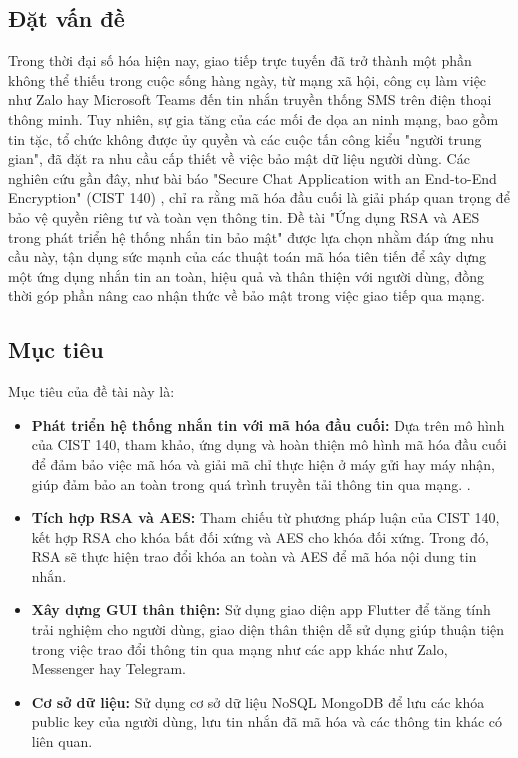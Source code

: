 \setcounter{section}{0}
\renewcommand{\thesubsection}{\arabic{subsection}.}

\subsection{Đặt vấn đề}
\indent Trong thời đại số hóa hiện nay, giao tiếp trực tuyến đã trở thành một phần không thể thiếu trong cuộc sống hàng ngày, từ mạng xã hội, công cụ làm việc như Zalo hay Microsoft Teams đến tin nhắn truyền thống SMS trên điện thoại thông minh. Tuy nhiên, sự gia tăng của các mối đe dọa an ninh mạng, bao gồm tin tặc, tổ chức không được ủy quyền và các cuộc tấn công kiểu "người trung gian", đã đặt ra nhu cầu cấp thiết về việc bảo mật dữ liệu người dùng. Các nghiên cứu gần đây, như bài báo "Secure Chat Application with an End-to-End Encryption" (CIST 140) \cite{carranza2024}, chỉ ra rằng mã hóa đầu cuối là giải pháp quan trọng để bảo vệ quyền riêng tư và toàn vẹn thông tin. Đề tài "Ứng dụng RSA và AES trong phát triển hệ thống nhắn tin bảo mật" được lựa chọn nhằm đáp ứng nhu cầu này, tận dụng sức mạnh của các thuật toán mã hóa tiên tiến để xây dựng một ứng dụng nhắn tin an toàn, hiệu quả và thân thiện với người dùng, đồng thời góp phần nâng cao nhận thức về bảo mật trong việc giao tiếp qua mạng.
\subsection{ Mục tiêu}
\indent Mục tiêu của đề tài này là:
\begin{itemize}
  \item \textbf{Phát triển hệ thống nhắn tin với mã hóa đầu cuối:} 
  Dựa trên mô hình của CIST 140, tham khảo, ứng dụng và hoàn thiện mô hình mã hóa đầu cuối để đảm bảo việc mã hóa và giải mã chỉ thực hiện ở máy gửi hay máy nhận, giúp đảm bảo an toàn trong quá trình truyền tải thông tin qua mạng. \cite{carranza2024}.

  \item \textbf{Tích hợp RSA và AES:} 
  Tham chiếu từ phương pháp luận của CIST 140, kết hợp RSA cho khóa bất đối xứng và AES cho khóa đối xứng. Trong đó, RSA sẽ thực hiện trao đổi khóa an toàn và AES để mã hóa nội dung tin nhắn.

  \item \textbf{Xây dựng GUI thân thiện:} 
  Sử dụng giao diện app Flutter \cite{flutter_doc} để tăng tính trải nghiệm cho người dùng, giao diện thân thiện dễ sử dụng giúp thuận tiện trong việc trao đổi thông tin qua mạng như các app khác như Zalo, Messenger hay Telegram.
  
  \item \textbf{Cơ sở dữ liệu:}
  Sử dụng cơ sở dữ liệu NoSQL MongoDB \cite{mongodb_doc} để lưu các khóa public key của người dùng, lưu tin nhắn đã mã hóa và các thông tin khác có liên quan.
\end{itemize}


